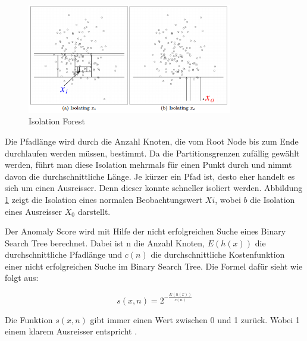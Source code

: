 \begin{figure}[h]
  \centering
  \includegraphics[width=0.8\textwidth]{images/isolation_forest.png}
  \caption[Isolation Forest]{Isolation Forest}%
  \label{fig:hintergrund_isolation_forest}
\end{figure}

Die Pfadlänge wird durch die Anzahl Knoten, die vom Root Node bis zum Ende durchlaufen werden müssen, bestimmt. Da die Partitionsgrenzen zufällig gewählt werden, führt man diese Isolation mehrmals für einen Punkt durch und nimmt davon die durchschnittliche Länge. Je kürzer ein Pfad ist, desto eher handelt es sich um einen Ausreisser. Denn dieser konnte schneller isoliert werden. Abbildung \ref{fig:hintergrund_isolation_forest} zeigt die Isolation  eines normalen Beobachtungswert $Xi$, wobei $b$ die Isolation eines Ausreisser $X_0$ darstellt.

Der Anomaly Score wird mit Hilfe der nicht erfolgreichen Suche eines Binary Search Tree berechnet. Dabei ist n die Anzahl Knoten, $E(h(x))$ die durchschnittliche Pfadlänge und $c(n)$ die durchschnittliche Kostenfunktion einer nicht erfolgreichen Suche im Binary Search Tree. Die Formel dafür sieht wie folgt aus:

\begin{equation}\label{eq:isolation}
s(x, n) = 2^{-\frac{E(h(x))}{c(n)}}
\end{equation}

Die Funktion $s(x, n)$ gibt immer einen Wert zwischen 0 und 1 zurück. Wobei 1 einem klarem Ausreisser entspricht \cite{isolation_forest_2}.